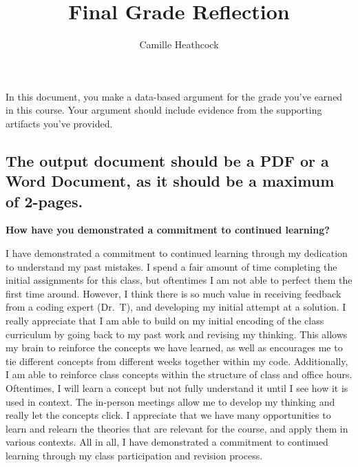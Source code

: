 \documentclass[
  letterpaper,
  DIV=11,
  numbers=noendperiod]{scrartcl}
\title{Final Grade Reflection}
\author{Camille Heathcock}
\date{}
\begin{document}
\maketitle
\ifdefined\Shaded\renewenvironment{Shaded}{\begin{tcolorbox}[breakable, enhanced, frame hidden, boxrule=0pt, borderline west={3pt}{0pt}{shadecolor}, sharp corners, interior hidden]}{\end{tcolorbox}}\fi

In this document, you make a data-based argument for the grade you've
earned in this course. Your argument should include evidence from the
supporting artifacts you've provided.

\hypertarget{the-output-document-should-be-a-pdf-or-a-word-document-as-it-should-be-a-maximum-of-2-pages.}{%
\subsection{\texorpdfstring{The output document should be a PDF or a
Word Document, as it should be a \textbf{maximum} of
2-pages.}{The output document should be a PDF or a Word Document, as it should be a maximum of 2-pages.}}\label{the-output-document-should-be-a-pdf-or-a-word-document-as-it-should-be-a-maximum-of-2-pages.}}

\textbf{How have you demonstrated a commitment to continued learning?}

I have demonstrated a commitment to continued learning through my
dedication to understand my past mistakes. I spend a fair amount of time
completing the initial assignments for this class, but oftentimes I am
not able to perfect them the first time around. However, I think there
is so much value in receiving feedback from a coding expert (Dr.~T), and
developing my initial attempt at a solution. I really appreciate that I
am able to build on my initial encoding of the class curriculum by going
back to my past work and revising my thinking. This allows my brain to
reinforce the concepts we have learned, as well as encourages me to tie
different concepts from different weeks together within my code.
Additionally, I am able to reinforce class concepts within the structure
of class and office hours. Oftentimes, I will learn a concept but not
fully understand it until I see how it is used in context. The in-person
meetings allow me to develop my thinking and really let the concepts
click. I appreciate that we have many opportunities to learn and relearn
the theories that are relevant for the course, and apply them in various
contexts. All in all, I have demonstrated a commitment to continued
learning through my class participation and revision process.
\end{document}
